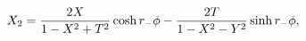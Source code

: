 \begin{equation}
X_2 = {2 X  \over 1-X^2+T^2 }\cosh r_- \phi - {2 T \over
  1-X^2-Y^2 } \sinh r_- \phi,
\end{equation}

